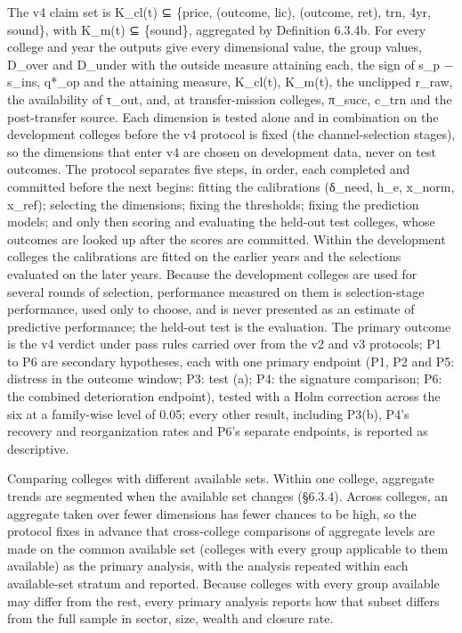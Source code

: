 \documentclass[
]{article}
\begin{document}
The v4 claim set is K\_cl(t) ⊆ \{price, (outcome, lic), (outcome, ret),
trn, 4yr, sound\}, with K\_m(t) ⊆ \{sound\}, aggregated by Definition
6.3.4b. For every college and year the outputs give every dimensional
value, the group values, D\_over and D\_under with the outside measure
attaining each, the sign of s\_p − s\_ins, q*\_op and the attaining
measure, K\_cl(t), K\_m(t), the unclipped r\_raw, the availability of
τ\_out, and, at transfer-mission colleges, π\_succ, c\_trn and the
post-transfer source. Each dimension is tested alone and in combination
on the development colleges before the v4 protocol is fixed (the
channel-selection stages), so the dimensions that enter v4 are chosen on
development data, never on test outcomes. The protocol separates five
steps, in order, each completed and committed before the next begins:
fitting the calibrations (δ\_need, h\_e, x\_norm, x\_ref); selecting the
dimensions; fixing the thresholds; fixing the prediction models; and
only then scoring and evaluating the held-out test colleges, whose
outcomes are looked up after the scores are committed. Within the
development colleges the calibrations are fitted on the earlier years
and the selections evaluated on the later years. Because the development
colleges are used for several rounds of selection, performance measured
on them is selection-stage performance, used only to choose, and is
never presented as an estimate of predictive performance; the held-out
test is the evaluation. The primary outcome is the v4 verdict under pass
rules carried over from the v2 and v3 protocols; P1 to P6 are secondary
hypotheses, each with one primary endpoint (P1, P2 and P5: distress in
the outcome window; P3: test (a); P4: the signature comparison; P6: the
combined deterioration endpoint), tested with a Holm correction across
the six at a family-wise level of 0.05; every other result, including
P3(b), P4's recovery and reorganization rates and P6's separate
endpoints, is reported as descriptive.

Comparing colleges with different available sets. Within one college,
aggregate trends are segmented when the available set changes (§6.3.4).
Across colleges, an aggregate taken over fewer dimensions has fewer
chances to be high, so the protocol fixes in advance that cross-college
comparisons of aggregate levels are made on the common available set
(colleges with every group applicable to them available) as the primary
analysis, with the analysis repeated within each available-set stratum
and reported. Because colleges with every group available may differ
from the rest, every primary analysis reports how that subset differs
from the full sample in sector, size, wealth and closure rate.
\end{document}
